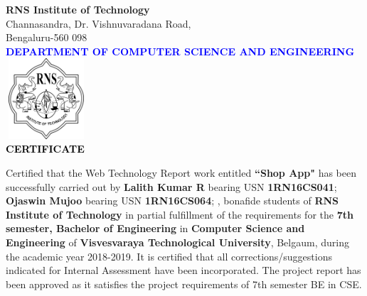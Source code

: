 \thispagestyle{empty}
\begin{center}

\textup{\large {\textcolor{darkbrown}{\bf RNS Institute of Technology}} \\ 
\normalsize{\textcolor{darkbrown}{Channasandra, Dr. Vishnuvaradana Road,\\ Bengaluru-560 098}}}\\[0.1in]
\textup{\normalsize {\textcolor{blue}{\bf DEPARTMENT OF COMPUTER SCIENCE AND ENGINEERING}}}\\[0.1in]
\includegraphics[width=3cm, height=3cm]{../static/media/RNS_logo.png}\\[0.1in]
\textup{\large {\textcolor{black}{\textbf {CERTIFICATE}}}} \\[0.1in]
\end{center}

\begin{minipage}{14.8cm}
Certified that the Web Technology Report work entitled \textbf{``Shop App"} has been successfully carried out by \textbf{Lalith Kumar R} bearing USN \textbf{1RN16CS041};  \textbf{Ojaswin Mujoo} bearing USN \textbf{1RN16CS064};  , bonafide students of \textbf{RNS Institute of Technology} in partial fulfillment of the requirements for the \textbf{7th semester, Bachelor of Engineering} in \textbf{Computer Science and Engineering} of \textbf{Visvesvaraya Technological University}, Belgaum, during the academic year 2018-2019. It is certified that all corrections/suggestions indicated for Internal Assessment have been incorporated. The project report has been approved as it satisfies the project requirements of 7th semester BE in CSE.\\[0.4in]
\end{minipage}

